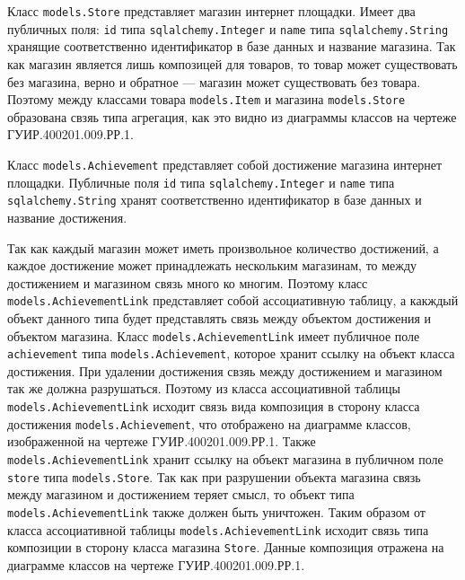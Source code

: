 Класс \texttt{models.Store} представляет магазин интернет площадки. Имеет два публичных поля: \texttt{id} типа \texttt{sqlalchemy.Integer} и \texttt{name} типа \texttt{sqlalchemy.String} хранящие соответственно идентификатор в базе данных и название магазина. Так как магазин является лишь композицей для товаров, то товар может существовать без магазина, верно и обратное --- магазин может существовать без товара. Поэтому между классами товара \texttt{models.Item} и магазина \texttt{models.Store} образована свзяь типа агрегация, как это видно из диаграммы классов на чертеже ГУИР.400201.009.РР.1.

Класс \texttt{models.Achievement} представляет собой достижение магазина интернет площадки. Публичные поля \texttt{id} типа \texttt{sqlalchemy.Integer} и \texttt{name} типа \texttt{sqlalchemy.String} хранят соответственно идентификатор в базе данных и название достижения.

Так как каждый магазин может иметь произвольное количество достижений, а каждое достижение может принадлежать нескольким магазинам, то между достижением и магазином связь много ко многим. Поэтому класс \texttt{models.AchievementLink} представляет собой ассоциативную таблицу, а какждый объект данного типа будет представлять связь между объектом достижения и объектом магазина. Класс \texttt{models.AchievementLink} имеет публичное поле \texttt{achievement} типа \texttt{models.Achievement}, которое хранит ссылку на объект класса достижения. При удалении достижения свзяь между достижением и магазином так же должна разрушаться. Поэтому из класса ассоциативной таблицы \texttt{models.AchievementLink} исходит связь вида композиция в сторону класса достижения \texttt{models.Achievement}, что отображено на диаграмме классов, изображенной на чертеже ГУИР.400201.009.РР.1. Также \texttt{models.AchievementLink} хранит ссылку на объект магазина в публичном поле \texttt{store} типа \texttt{models.Store}. Так как при разрушении объекта магазина связь между магазином и достижением теряет смысл, то объект типа \texttt{models.AchievementLink} также должен быть уничтожен. Таким образом от класса ассоциативной таблицы \texttt{models.AchievementLink} исходит связь типа композиции в сторону класса магазина \texttt{Store}. Данные композиция отражена на диаграмме классов на чертеже ГУИР.400201.009.РР.1.

